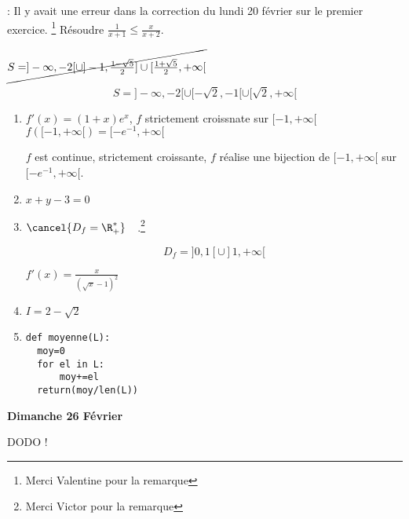 \documentclass[a4paper, 11pt,reqno]{article}
\begin{document}
\begin{correction}
\warning : Il y avait une erreur dans la correction du lundi 20 février sur  le premier exercice. \footnote{Merci Valentine pour la remarque} 
Résoudre $\frac{1}{x+1}\leq \frac{x}{x+2}$.

$\cancel{S=]-\infty, -2[ \cup ]-1,\frac{1-\sqrt{5}}{2}] \cup [\frac{1+\sqrt{5}}{2},+\infty[}$

$$S=]-\infty, -2[ \cup [-\sqrt{2},-1[ \cup [\sqrt{2},+\infty[$$






\begin{enumerate}
\item  $f'(x) =(1+x)e^{x}$, $f$ strictement croissnate sur $[-1, +\infty[$ $f([-1,+\infty[) =[-e^{-1} , +\infty[$

$f$ est continue, strictement croissante, $f$ réalise une bijection de $ [-1, +\infty[$ sur $[-e^{-1} , +\infty[$. 



\item $x+y-3=0$
\item $\cancel{D_f =\R_+^*}\quad$.\footnote{Merci Victor pour la remarque}


$$D_f= ]0,1[\cup ]1,+\infty[$$


$f'(x) = \frac{x}{(\sqrt{x}-1)^2}$ 
\item $I= 2-\sqrt{2}$
\item 
\begin{lstlisting}
def moyenne(L):
  moy=0
  for el in L:
      moy+=el
  return(moy/len(L))
\end{lstlisting}
\end{enumerate}
\end{correction}
 




\begin{center}
\textbf{Dimanche 26 Février }
\end{center}

\newpage
\vspace{0.3cm}
\begin{center}
DODO ! 
\end{center}
\end{document}
